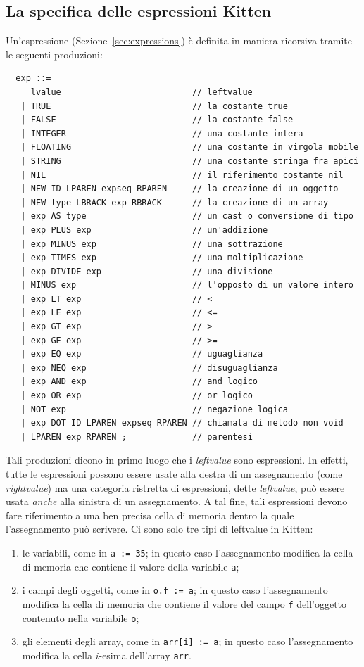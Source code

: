 \subsection{La specifica delle espressioni Kitten}
  \label{subsec:expressions_specification}
%
Un'espressione (Sezione~\ref{sec:expressions})
\`e definita in maniera ricorsiva tramite le seguenti produzioni:
%
\begin{verbatim}
  exp ::=
     lvalue                          // leftvalue
   | TRUE                            // la costante true
   | FALSE                           // la costante false
   | INTEGER                         // una costante intera
   | FLOATING                        // una costante in virgola mobile
   | STRING                          // una costante stringa fra apici
   | NIL                             // il riferimento costante nil
   | NEW ID LPAREN expseq RPAREN     // la creazione di un oggetto
   | NEW type LBRACK exp RBRACK      // la creazione di un array
   | exp AS type                     // un cast o conversione di tipo
   | exp PLUS exp                    // un'addizione
   | exp MINUS exp                   // una sottrazione
   | exp TIMES exp                   // una moltiplicazione
   | exp DIVIDE exp                  // una divisione
   | MINUS exp                       // l'opposto di un valore intero
   | exp LT exp                      // <
   | exp LE exp                      // <=
   | exp GT exp                      // >
   | exp GE exp                      // >=
   | exp EQ exp                      // uguaglianza
   | exp NEQ exp                     // disuguaglianza
   | exp AND exp                     // and logico
   | exp OR exp                      // or logico
   | NOT exp                         // negazione logica
   | exp DOT ID LPAREN expseq RPAREN // chiamata di metodo non void
   | LPAREN exp RPAREN ;             // parentesi
\end{verbatim}
%
Tali produzioni dicono in primo luogo che i \emph{leftvalue} sono
espressioni. In effetti, tutte le espressioni possono essere usate
alla destra di un assegnamento (come \emph{rightvalue}) ma
una categoria ristretta di espressioni, dette \emph{leftvalue}, pu\`o
essere usata \emph{anche} alla sinistra di un assegnamento.
A tal fine, tali espressioni devono fare riferimento a una ben precisa
cella di memoria dentro la quale l'assegnamento pu\`o scrivere.
Ci sono solo tre tipi di leftvalue in Kitten:
%
\begin{enumerate}
\item le variabili, come in \texttt{a := 35}; in questo caso l'assegnamento
      modifica la cella di memoria che contiene il valore della variabile
      \texttt{a};
\item i campi degli oggetti, come in \texttt{o.f := a}; in questo caso
      l'assegnamento modifica la cella di memoria che contiene il valore
      del campo \texttt{f} dell'oggetto contenuto nella variabile
      \texttt{o};
\item gli elementi degli array, come in \texttt{arr[i] := a}; in questo caso
      l'assegnamento modifica la cella $i$-esima dell'array \texttt{arr}.
\end{enumerate}
